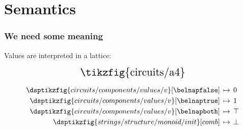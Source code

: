 \section{Semantics}

\begin{frame}
    \frametitle{We need some meaning}

    \pause
    Values are interpreted in a \alert{lattice}:

    \pause
    \begin{minipage}{0.49\textwidth}
        \[
            \scalebox{1.5}{\tikzfig{circuits/a4}}
        \]
    \end{minipage}
    \pause
    \begin{minipage}{0.49\textwidth}
        \begin{align*}
            \dsptikzfig{circuits/components/values/v}[\belnapfalse]
            \,&\mapsto\, 0 \\
            \dsptikzfig{circuits/components/values/v}[\belnaptrue]
            \,&\mapsto\, 1 \\
            \dsptikzfig{circuits/components/values/v}[\belnapboth]
            \,&\mapsto\, \top \\
            \dsptikzfig{strings/structure/monoid/init}[comb]
            \,&\mapsto\, \bot \\
        \end{align*}
    \end{minipage}
\end{frame}
